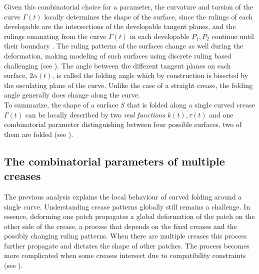 Given this combinatorial choice for a parameter, the curvature and torsion of the curve $\Gamma(t)$ locally determines the shape of the surface, since the rulings of each developable are the intersections of the developable tangent planes, and the rulings emanating from the curve $\Gamma(t)$ in each developable $P_1,P_2$ continue until their boundary \cite{spivak,more_on_paper}. The ruling patterns of the surfaces change as well during the deformation, making modeling of such surfaces using discrete ruling based challenging (see ). The angle between the different tangent planes on each surface, $2\alpha(t)$, is called the folding angle which by construction is bisected by the osculating plane of the curve. Unlike the case of a straight crease, the folding angle generally does change along the curve. \\

To summarize, the shape of a surface $S$ that is folded along a single curved crease $\Gamma(t)$ can be locally described by two \textit{real functions} $k(t),\tau(t)$ and one combinatorial parameter distinguishing between four possible surfaces, two of them are folded (see ).
 

\subsection{The combinatorial parameters of multiple creases}
The previous analysis explains the local behaviour of curved folding around a single curve. Understanding crease patterns globally still remains a challenge. In essence, deforming one patch propagates a global deformation of the patch on the other side of the crease, a process that depends on the fixed creases and the possibly changing ruling patterns. When there are multiple creases this process further propagate and dictates the shape of other patches. The process becomes more complicated when some creases intersect due to compatibility constraints (see ). 

